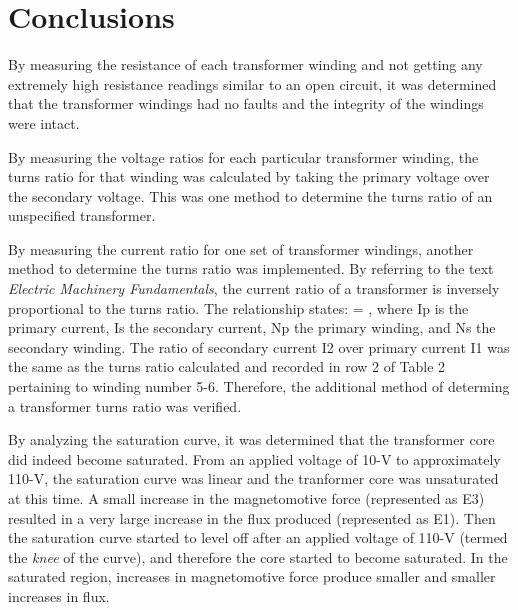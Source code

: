 \documentclass{article}
\begin{document}
\section{Conclusions}
By measuring the resistance of each transformer winding and not getting any extremely high resistance 
readings similar to an open circuit, it was determined that the transformer windings had no faults and 
the integrity of the windings were intact.

By measuring the voltage ratios for each particular transformer winding, the turns ratio for that winding
was calculated by taking the primary voltage over the secondary voltage. This was one method to determine
the turns ratio of an unspecified transformer. 

By measuring the current ratio for one set of transformer windings, another method to determine the turns ratio
was implemented. By referring to the text \emph{Electric Machinery Fundamentals}, the current ratio of a 
transformer is inversely proportional to the turns ratio. The relationship states:  = , 
where Ip is the primary current, Is the secondary current, Np the primary winding, and Ns the secondary winding. 
The ratio of secondary current I2 over primary current I1 was the same as the turns ratio calculated and recorded 
in row 2 of Table 2 pertaining to winding number 5-6. Therefore, the additional method of determing a transformer 
turns ratio was verified.

By analyzing the saturation curve, it was determined that the transformer core did indeed become saturated.
From an applied voltage of 10-V to approximately 110-V, the saturation curve was linear and the tranformer
core was unsaturated at this time. A small increase in the magnetomotive force (represented as E3) resulted in 
a very large increase in the flux produced (represented as E1). Then the saturation curve started to level off 
after an applied voltage of 110-V (termed the \emph{knee} of the curve), and therefore the core started to 
become saturated. In the saturated region, increases in magnetomotive force produce smaller and smaller increases 
in flux.
\end{document}
